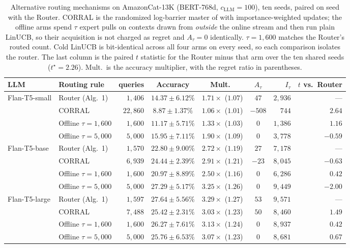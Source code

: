\documentclass[anon]{alt2027} %
\begin{document}
\begin{table}[ht]
\centering
\caption{Alternative routing mechanisms on AmazonCat-13K (BERT-768d,
$c_{\mathrm{LLM}}=100$), ten seeds, paired on seed with the Router. CORRAL is the randomized
log-barrier master of \citet{agarwal2017corralling} with importance-weighted
updates; the offline arms spend $\tau$ expert pulls on contexts drawn from
\emph{outside} the online stream and then run plain LinUCB, so their
acquisition is not charged as regret and $A_\tau=0$ identically.
$\tau=1{,}600$ matches the Router's routed count. Cold LinUCB is bit-identical
across all four arms on every seed, so each comparison isolates the router.
The last column is the paired $t$ statistic for the Router minus that arm over the
ten shared seeds ($t^\star=2.26$). Mult.\ is the accuracy multiplier, with
the regret ratio in parentheses.}
\label{tab:baselines}
\small
\setlength{\tabcolsep}{4pt}
\begin{tabular}{@{}llrcccrr@{}}
\toprule
LLM & Routing rule & queries & Accuracy & Mult.\ & $A_\tau$ & $I_\tau$ & $t$ vs.\ Router \\
\midrule
\multirow{4}{*}{Flan-T5-small}
 & Router (Alg.\ 1)    & $1{,}406$  & $14.37\pm6.12\%$ & $1.71\times$ ($1.07$) & $47$   & $2{,}936$ & --- \\
 & CORRAL            & $22{,}860$ & $8.87\pm1.37\%$  & $1.06\times$ ($1.01$) & $-508$ & $744$     & $\mathbf{2.64}$ \\
 & Offline $\tau{=}1{,}600$ & $1{,}600$ & $11.17\pm5.71\%$ & $1.33\times$ ($1.03$) & $0$ & $1{,}386$ & $1.16$ \\
 & Offline $\tau{=}5{,}000$ & $5{,}000$ & $15.95\pm7.11\%$ & $1.90\times$ ($1.09$) & $0$ & $3{,}778$ & $-0.59$ \\
\midrule
\multirow{4}{*}{Flan-T5-base}
 & Router (Alg.\ 1)    & $1{,}570$ & $22.80\pm9.00\%$ & $2.72\times$ ($1.19$) & $27$  & $7{,}178$ & --- \\
 & CORRAL            & $6{,}939$ & $24.44\pm2.39\%$ & $2.91\times$ ($1.21$) & $-23$ & $8{,}045$ & $-0.63$ \\
 & Offline $\tau{=}1{,}600$ & $1{,}600$ & $20.97\pm8.89\%$ & $2.50\times$ ($1.16$) & $0$ & $6{,}286$ & $0.42$ \\
 & Offline $\tau{=}5{,}000$ & $5{,}000$ & $27.29\pm5.17\%$ & $3.25\times$ ($1.26$) & $0$ & $9{,}449$ & $-2.00$ \\
\midrule
\multirow{4}{*}{Flan-T5-large}
 & Router (Alg.\ 1)    & $1{,}597$ & $27.64\pm5.56\%$ & $3.29\times$ ($1.27$) & $53$ & $9{,}571$ & --- \\
 & CORRAL            & $7{,}488$ & $25.42\pm2.31\%$ & $3.03\times$ ($1.23$) & $50$ & $8{,}460$ & $1.49$ \\
 & Offline $\tau{=}1{,}600$ & $1{,}600$ & $26.27\pm7.61\%$ & $3.13\times$ ($1.24$) & $0$ & $8{,}937$ & $0.42$ \\
 & Offline $\tau{=}5{,}000$ & $5{,}000$ & $25.76\pm6.53\%$ & $3.07\times$ ($1.23$) & $0$ & $8{,}681$ & $0.67$ \\
\bottomrule
\end{tabular}
\end{table}
\end{document}
